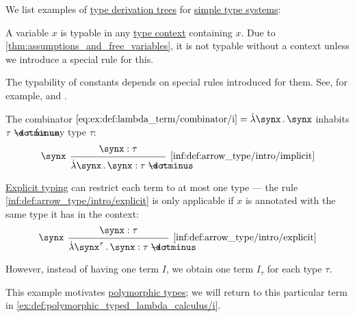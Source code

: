\begin{example}\label{ex:def:type_derivation_tree}
  We list examples of \hyperref[def:type_derivation_tree]{type derivation trees} for \hyperref[def:simple_type_system]{simple type systems}:
  \begin{thmenum}
     A variable \( x \) is typable in any \hyperref[def:type_context]{type context} containing \( x \). Due to \cref{thm:assumptions_and_free_variables}, it is not typable without a context unless we introduce a special rule for this.

     The typability of constants depends on special rules introduced for them. See, for example,  and .

     The combinator \( \ref{eq:ex:def:lambda_term/combinator/i} = \qabs \synx \synx \) inhabits \( \tau \synimplies \tau \) for any type \( \tau \):
    \begin{equation*}
      \begin{prooftree}
        \hypo{ \synx: \tau }
        \infer[left label=\( \synx \)]1[\ref{inf:def:arrow_type/intro/implicit}]{ \qabs \synx \synx: \tau \synimplies \tau }
      \end{prooftree}
    \end{equation*}

    \hyperref[def:simple_type_system_style]{Explicit typing} can restrict each term to at most one type --- the rule \ref{inf:def:arrow_type/intro/explicit} is only applicable if \( x \) is annotated with the same type it has in the context:
    \begin{equation*}
      \begin{prooftree}
        \hypo{ \synx: \tau }
        \infer[left label=\( \synx \)]1[\ref{inf:def:arrow_type/intro/explicit}]{ \qabs {\synx^\tau} \synx: \tau \synimplies \tau }
      \end{prooftree}
    \end{equation*}

    However, instead of having one term \( I \), we obtain one term \( I_\tau \) for each type \( \tau \).

    This example motivates \hyperref[def:polymorphic_typed_lambda_calculus]{polymorphic types}; we will return to this particular term in \cref{ex:def:polymorphic_typed_lambda_calculus/i}.


\end{thmenum}
\end{example}
